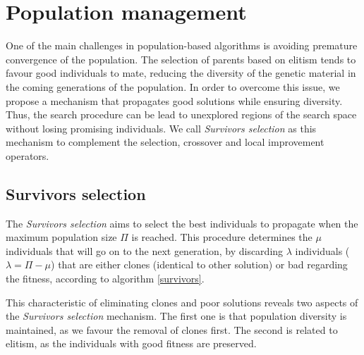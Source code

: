 \section{Population management}
\label{sec:population-management}
One of the main challenges in population-based algorithms is avoiding premature convergence of the population. The selection of parents based on elitism tends to favour good individuals to mate, reducing the diversity of the genetic material in the coming generations of the population. In order to overcome this issue, we propose a mechanism that propagates good solutions while ensuring diversity. Thus, the search procedure can be lead to unexplored regions of the search space without losing promising individuals. We call \textit{Survivors selection} as this mechanism to complement the selection, crossover and local improvement operators.


\subsection{Survivors selection}
\label{subsec:survivors}
The \textit{Survivors selection} aims to select the best individuals to propagate when the maximum population size $\Pi$ is reached. This procedure determines the $\mu$ individuals that will go on to the next generation, by discarding $\lambda$ individuals ($\lambda = \Pi - \mu$) that are either clones (identical to other solution) or bad regarding the fitness, according to algorithm \ref{survivors}.

This characteristic of eliminating clones and poor solutions reveals two aspects of the \textit{Survivors selection} mechanism. The first one is that population diversity is maintained, as we favour the removal of clones first. The second is related to elitism, as the individuals with good fitness are preserved. %

